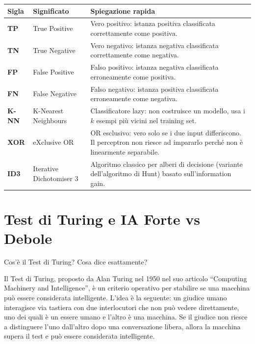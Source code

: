 \documentclass[12pt,a4paper]{article}
\begin{document}
{\vspace{6pt}

\begin{tcolorbox}[colback=purple!3, colframe=purple!50!black,
  title=\textbf{Machine Learning e Matrice di Confusione}, fonttitle=\bfseries\small, breakable]
\begin{tabularx}{\linewidth}{@{}p{1.5cm} p{4.6cm} X@{}}
\toprule
\textbf{Sigla} & \textbf{Significato} & \textbf{Spiegazione rapida} \\
\midrule
\textbf{TP}   & True Positive               & Vero positivo: istanza positiva classificata correttamente come positiva. \\
\textbf{TN}   & True Negative               & Vero negativo: istanza negativa classificata correttamente come negativa. \\
\textbf{FP}   & False Positive              & Falso positivo: istanza negativa classificata erroneamente come positiva. \\
\textbf{FN}   & False Negative              & Falso negativo: istanza positiva classificata erroneamente come negativa. \\
\textbf{K-NN} & K-Nearest Neighbours        & Classificatore lazy: non costruisce un modello, usa i $k$ esempi più vicini nel training set. \\
\textbf{XOR}  & eXclusive OR                & OR esclusivo: vero solo se i due input differiscono. Il perceptron non riesce ad impararlo perché non è linearmente separabile. \\
\textbf{ID3}  & Iterative Dichotomiser 3    & Algoritmo classico per alberi di decisione (variante dell'algoritmo di Hunt) basato sull'information gain. \\
\bottomrule
\end{tabularx}
\end{tcolorbox}
} %

\newpage

\section{Test di Turing e IA Forte vs Debole}

\begin{domandabox}{Cos'è il Test di Turing? Cosa dice esattamente?}
\end{domandabox}

Il Test di Turing, proposto da Alan Turing nel 1950 nel suo articolo ``Computing Machinery and Intelligence'', è un criterio operativo per stabilire se una macchina può essere considerata intelligente. L'idea è la seguente: un giudice umano interagisce via tastiera con due interlocutori che non può vedere direttamente, uno dei quali è un essere umano e l'altro è una macchina. Se il giudice non riesce a distinguere l'uno dall'altro dopo una conversazione libera, allora la macchina supera il test e può essere considerata intelligente.
\end{document}
